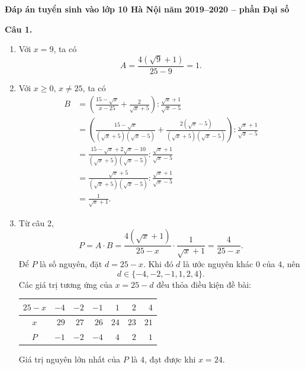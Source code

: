 \documentclass[12pt,a4paper]{article}
\begin{document}
\begin{center}
{\Large\bfseries Đáp án tuyển sinh vào lớp 10 Hà Nội năm 2019--2020 -- phần Đại số}
\end{center}

\textbf{Câu 1.}
\begin{enumerate}[label=\alph*)]
  \item Với $x=9$, ta có
  \[
  A=\frac{4(\sqrt{9}+1)}{25-9}=1.
  \]
  \item Với $x\ge0$, $x\ne25$, ta có
  \begin{align*}
  B&=\left(\frac{15-\sqrt{x}}{x-25}+\frac{2}{\sqrt{x}+5}\right):\frac{\sqrt{x}+1}{\sqrt{x}-5}\\
   &=\left(\frac{15-\sqrt{x}}{(\sqrt{x}+5)(\sqrt{x}-5)}
      +\frac{2(\sqrt{x}-5)}{(\sqrt{x}+5)(\sqrt{x}-5)}\right):\frac{\sqrt{x}+1}{\sqrt{x}-5}\\
   &=\frac{15-\sqrt{x}+2\sqrt{x}-10}{(\sqrt{x}+5)(\sqrt{x}-5)}
      :\frac{\sqrt{x}+1}{\sqrt{x}-5}\\
   &=\frac{\sqrt{x}+5}{(\sqrt{x}+5)(\sqrt{x}-5)}
      :\frac{\sqrt{x}+1}{\sqrt{x}-5}\\
   &=\frac{1}{\sqrt{x}+1}.
  \end{align*}
  \item Từ câu 2,
  \[
  P=A\cdot B=\frac{4(\sqrt{x}+1)}{25-x}\cdot\frac{1}{\sqrt{x}+1}
   =\frac{4}{25-x}.
  \]
  Để $P$ là số nguyên, đặt $d=25-x$. Khi đó $d$ là ước nguyên khác $0$ của $4$, nên
  \[
  d\in\{-4,-2,-1,1,2,4\}.
  \]
  Các giá trị tương ứng của $x=25-d$ đều thỏa điều kiện đề bài:
  \begin{center}
  \begin{tabular}{c|rrrrrr}
  $25-x$ & $-4$ & $-2$ & $-1$ & $1$ & $2$ & $4$\\ \hline
  $x$ & $29$ & $27$ & $26$ & $24$ & $23$ & $21$\\
  $P$ & $-1$ & $-2$ & $-4$ & $4$ & $2$ & $1$
  \end{tabular}
  \end{center}
  Giá trị nguyên lớn nhất của $P$ là $4$, đạt được khi $x=24$.
\end{enumerate}
\end{document}
